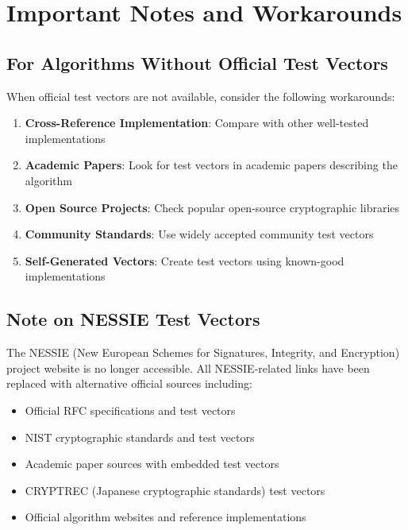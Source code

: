 \documentclass[12pt,a4paper]{article}
\begin{document}
\newpage

\section{Important Notes and Workarounds}

\subsection{For Algorithms Without Official Test Vectors}

When official test vectors are not available, consider the following workarounds:

\begin{enumerate}
    \item \textbf{Cross-Reference Implementation}: Compare with other well-tested implementations
    \item \textbf{Academic Papers}: Look for test vectors in academic papers describing the algorithm
    \item \textbf{Open Source Projects}: Check popular open-source cryptographic libraries
    \item \textbf{Community Standards}: Use widely accepted community test vectors
    \item \textbf{Self-Generated Vectors}: Create test vectors using known-good implementations
\end{enumerate}

\subsection{Note on NESSIE Test Vectors}

The NESSIE (New European Schemes for Signatures, Integrity, and Encryption) project website is no longer accessible. All NESSIE-related links have been replaced with alternative official sources including:
\begin{itemize}
    \item Official RFC specifications and test vectors
    \item NIST cryptographic standards and test vectors
    \item Academic paper sources with embedded test vectors
    \item CRYPTREC (Japanese cryptographic standards) test vectors
    \item Official algorithm websites and reference implementations
\end{itemize}
\end{document}
